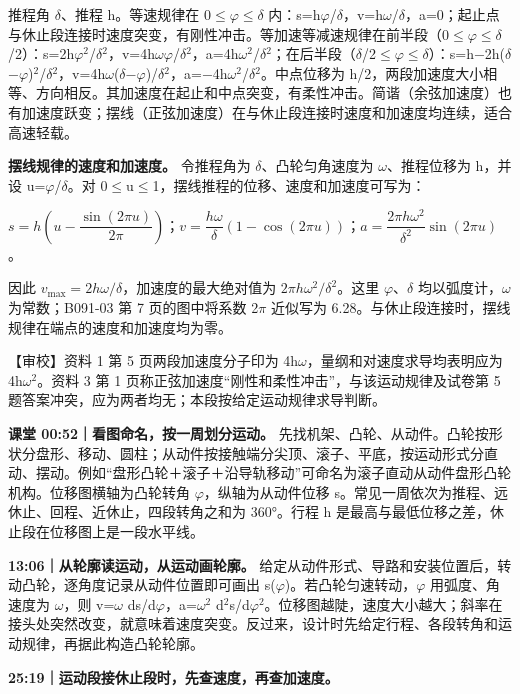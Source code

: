 \documentclass[zihao=5,a4paper,UTF8,fontset=fandol]{ctexart}
\begin{document}
推程角 $\delta$、推程 h。等速规律在 0$\le$$\varphi$$\le$$\delta$ 内：s=h$\varphi$/$\delta$，v=h$\omega$/$\delta$，a=0；起止点与休止段连接时速度突变，有刚性冲击。等加速等减速规律在前半段（0$\le$$\varphi$$\le$$\delta$/2）：s=2h$\varphi$$^{2}$/$\delta$$^{2}$，v=4h$\omega$$\varphi$/$\delta$$^{2}$，a=4h$\omega$$^{2}$/$\delta$$^{2}$；在后半段（$\delta$/2$\le$$\varphi$$\le$$\delta$）：s=h$-$2h($\delta$$-$$\varphi$)$^{2}$/$\delta$$^{2}$，v=4h$\omega$($\delta$$-$$\varphi$)/$\delta$$^{2}$，a=$-$4h$\omega$$^{2}$/$\delta$$^{2}$。中点位移为 h/2，两段加速度大小相等、方向相反。其加速度在起止和中点突变，有柔性冲击。简谐（余弦加速度）也有加速度跃变；摆线（正弦加速度）在与休止段连接时速度和加速度均连续，适合高速轻载。


\textbf{摆线规律的速度和加速度。} 令推程角为 $\delta$、凸轮匀角速度为 $\omega$、推程位移为 h，并设 u=$\varphi$/$\delta$。对 0$\le$u$\le$1，摆线推程的位移、速度和加速度可写为：


$s=h\left(u-\dfrac{\sin(2\pi u)}{2\pi}\right)$；$v=\dfrac{h\omega}{\delta}\left(1-\cos(2\pi u)\right)$；$a=\dfrac{2\pi h\omega^2}{\delta^2}\sin(2\pi u)$。


因此 $v_{\max}=2h\omega/\delta$，加速度的最大绝对值为 $2\pi h\omega^2/\delta^2$。这里 $\varphi$、$\delta$ 均以弧度计，$\omega$ 为常数；B091-03 第 7 页的图中将系数 2$\pi$ 近似写为 6.28。与休止段连接时，摆线规律在端点的速度和加速度均为零。


【审校】资料 1 第 5 页两段加速度分子印为 4h$\omega$，量纲和对速度求导均表明应为 4h$\omega$$^{2}$。资料 3 第 1 页称正弦加速度“刚性和柔性冲击”，与该运动规律及试卷第 5 题答案冲突，应为两者均无；本段按给定运动规律求导判断。


\textbf{课堂 00:52｜看图命名，按一周划分运动。} 先找机架、凸轮、从动件。凸轮按形状分盘形、移动、圆柱；从动件按接触端分尖顶、滚子、平底，按运动形式分直动、摆动。例如“盘形凸轮＋滚子＋沿导轨移动”可命名为滚子直动从动件盘形凸轮机构。位移图横轴为凸轮转角 $\varphi$，纵轴为从动件位移 s。常见一周依次为推程、远休止、回程、近休止，四段转角之和为 360°。行程 h 是最高与最低位移之差，休止段在位移图上是一段水平线。


\textbf{13:06｜从轮廓读运动，从运动画轮廓。} 给定从动件形式、导路和安装位置后，转动凸轮，逐角度记录从动件位置即可画出 s($\varphi$)。若凸轮匀速转动，$\varphi$ 用弧度、角速度为 $\omega$，则 v=$\omega$ ds/d$\varphi$，a=$\omega$$^{2}$ d$^{2}$s/d$\varphi$$^{2}$。位移图越陡，速度大小越大；斜率在接头处突然改变，就意味着速度突变。反过来，设计时先给定行程、各段转角和运动规律，再据此构造凸轮轮廓。


\textbf{25:19｜运动段接休止段时，先查速度，再查加速度。}
\end{document}
